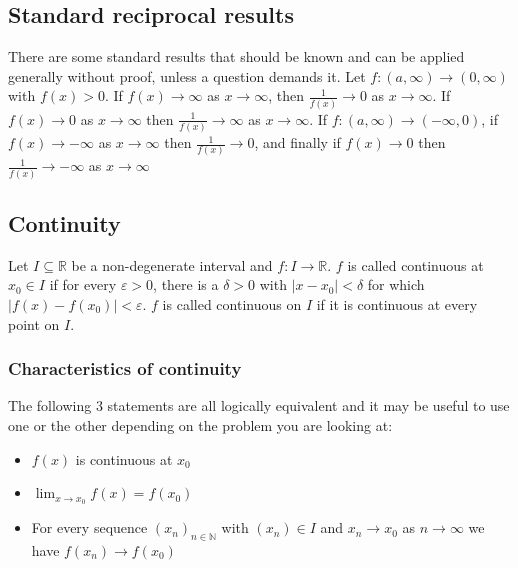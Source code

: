 \documentclass[12pt]{article}
\newcommand{\seq}[2]{(#1_#2)_{#2\in\mathbb{N}}}
\begin{document}
\subsection*{Standard reciprocal results}
There are some standard results that should be known and can be applied generally without proof, unless a question demands it. Let \(f:(a,\infty)\to(0,\infty)\) with \(f(x)>0\). If \(f(x)\to\infty\) as \(x\to\infty\), then \(\frac{1}{f(x)}\to0\) as \(x\to\infty\). If \(f(x)\to0\) as \(x\to\infty\) then \(\frac{1}{f(x)}\to\infty\) as \(x\to\infty\). If \(f:(a,\infty)\to(-\infty,0)\), if \(f(x)\to-\infty\) as \(x\to\infty\) then \(\frac{1}{f(x)}\to0\), and finally if \(f(x)\to0\) then \(\frac{1}{f(x)}\to-\infty\) as \(x\to\infty\)
\subsection*{Continuity}
Let \(I\subseteq\mathbb{R}\) be a non-degenerate interval and \(f:I\to\mathbb{R}\). \(f\) is called continuous at \(x_0\in I\) if for every \(\varepsilon>0\), there is a \(\delta>0\) with \(|x-x_0|<\delta\) for which \(|f(x)-f(x_0)|<\varepsilon\). \(f\) is called continuous on \(I\) if it is continuous at every point on \(I\).
\subsubsection*{Characteristics of continuity}
The following 3 statements are all logically equivalent and it may be useful to use one or the other depending on the problem you are looking at:
\begin{itemize}
    \item \(f(x)\) is continuous at \(x_0\)
    \item \(\lim_{x\to x_0}f(x)=f(x_0)\)
    \item For every sequence \(\seq{x}{n}\) with \((x_n)\in I\) and \(x_n\to x_0\) as \(n\to\infty\) we have \(f(x_n)\to f(x_0)\)
\end{itemize}
\end{document}
